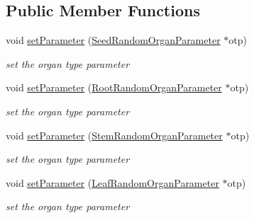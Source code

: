 \subsection*{Public Member Functions}
\begin{DoxyCompactItemize}
\item 
void \hyperlink{classCPlantBox_1_1Plant_a19971905d39798d9809ce87f0b51e48d}{set\+Parameter} (\hyperlink{classCPlantBox_1_1SeedRandomOrganParameter}{Seed\+Random\+Organ\+Parameter} $\ast$otp)
\begin{DoxyCompactList}\small\item\em set the organ type parameter \end{DoxyCompactList}\item 
\mbox{\label{classCPlantBox_1_1Plant_a0861bd30f6ffc92266e6ad816172c03c}} 
void \hyperlink{classCPlantBox_1_1Plant_a0861bd30f6ffc92266e6ad816172c03c}{set\+Parameter} (\hyperlink{classCPlantBox_1_1RootRandomOrganParameter}{Root\+Random\+Organ\+Parameter} $\ast$otp)
\begin{DoxyCompactList}\small\item\em set the organ type parameter \end{DoxyCompactList}\item 
\mbox{\label{classCPlantBox_1_1Plant_a963b84e32634526d5ab0698776ba4935}} 
void \hyperlink{classCPlantBox_1_1Plant_a963b84e32634526d5ab0698776ba4935}{set\+Parameter} (\hyperlink{classCPlantBox_1_1StemRandomOrganParameter}{Stem\+Random\+Organ\+Parameter} $\ast$otp)
\begin{DoxyCompactList}\small\item\em set the organ type parameter \end{DoxyCompactList}\item 
\mbox{\label{classCPlantBox_1_1Plant_a855536a583095eb2a984829ff963b96d}} 
void \hyperlink{classCPlantBox_1_1Plant_a855536a583095eb2a984829ff963b96d}{set\+Parameter} (\hyperlink{classCPlantBox_1_1LeafRandomOrganParameter}{Leaf\+Random\+Organ\+Parameter} $\ast$otp)
\begin{DoxyCompactList}\small\item\em set the organ type parameter \end{DoxyCompactList}\item 
\mbox{\label{classCPlantBox_1_1Plant_a6ad272cd6864b9b43b274e9d2b3b6688}} 

\end{DoxyCompactItemize}
